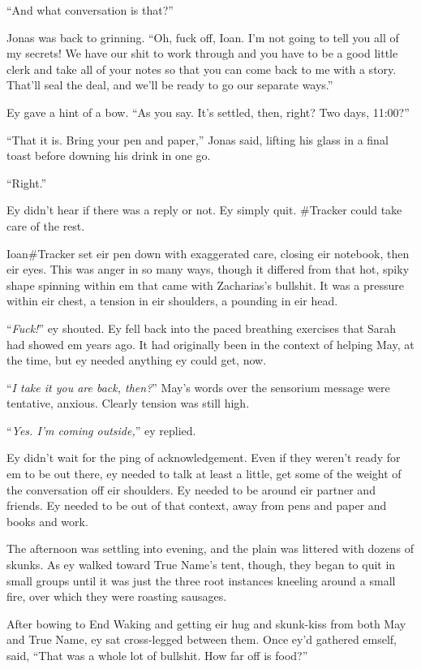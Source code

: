 ``And what conversation is that?''

Jonas was back to grinning. ``Oh, fuck off, Ioan. I'm not going to tell you all of my secrets! We have our shit to work through and you have to be a good little clerk and take all of your notes so that you can come back to me with a story. That'll seal the deal, and we'll be ready to go our separate ways.''

Ey gave a hint of a bow. ``As you say. It's settled, then, right? Two days, 11:00?''

``That it is. Bring your pen and paper,'' Jonas said, lifting his glass in a final toast before downing his drink in one go.

``Right.''

Ey didn't hear if there was a reply or not. Ey simply quit. \#Tracker could take care of the rest.

Ioan\#Tracker set eir pen down with exaggerated care, closing eir notebook, then eir eyes. This was anger in so many ways, though it differed from that hot, spiky shape spinning within em that came with Zacharias's bullshit. It was a pressure within eir chest, a tension in eir shoulders, a pounding in eir head.

``\emph{Fuck!}'' ey shouted. Ey fell back into the paced breathing exercises that Sarah had showed em years ago. It had originally been in the context of helping May, at the time, but ey needed anything ey could get, now.

``\emph{I take it you are back, then?}'' May's words over the sensorium message were tentative, anxious. Clearly tension was still high.

``\emph{Yes. I'm coming outside,}'' ey replied.

Ey didn't wait for the ping of acknowledgement. Even if they weren't ready for em to be out there, ey needed to talk at least a little, get some of the weight of the conversation off eir shoulders. Ey needed to be around eir partner and friends. Ey needed to be out of that context, away from pens and paper and books and work.

The afternoon was settling into evening, and the plain was littered with dozens of skunks. As ey walked toward True Name's tent, though, they began to quit in small groups until it was just the three root instances kneeling around a small fire, over which they were roasting sausages.

After bowing to End Waking and getting eir hug and skunk-kiss from both May and True Name, ey sat cross-legged between them. Once ey'd gathered emself, said, ``That was a whole lot of bullshit. How far off is food?''

